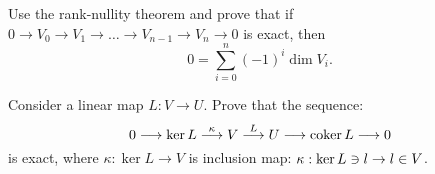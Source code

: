 \begin{prob}
  Use the rank-nullity theorem and prove that if $0\to V_0\to V_1\to\dots\to V_{n-1}\to V_n\to 0$ is exact, then
  $$0=\sum_{i=0}^n (-1)^i \dim V_i.$$
\end{prob}

\begin{prob}
  Consider a linear map $L : V\to U$. Prove that the sequence:
  $$0\longrightarrow \text{ker\,} L\stackrel{\kappa}{\longrightarrow} V\stackrel{L}{\longrightarrow} U\longrightarrow \text{coker\,} L \longrightarrow 0$$
  is exact, where $\kappa : \ker L \to V$ is inclusion map: $\kappa :\text{ker\,} L\ni l\to l\in V$.
\end{prob}
